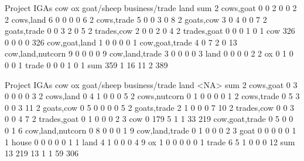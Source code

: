 \begin{Schunk}
\begin{Soutput}
                  Project
IGAs               cow  ox goat/sheep business/trade land sum
  2 cows,goat        0   0          2              0    0   2
  2 cows,land        6   0          0              0    0   6
  2 cows,trade       5   0          0              3    0   8
  2 goats,cow        3   0          4              0    0   7
  2 goats,trade      0   0          3              2    0   5
  2 trades,cow       2   0          0              2    0   4
  2 trades,goat      0   0          0              1    0   1
  cow              326   0          0              0    0 326
  cow,goat,land      1   0          0              0    0   1
  cow,goat,trade     4   0          7              2    0  13
  cow,land,nutcorn   9   0          0              0    0   9
  cow,land,trade     3   0          0              0    0   3
  land               0   0          0              0    2   2
  ox                 0   1          0              0    0   1
  trade              0   0          0              1    0   1
  sum              359   1         16             11    2 389
\end{Soutput}
\begin{Soutput}
                  Project
IGAs               cow  ox goat/sheep business/trade land <NA> sum
  2 cows,goat        0   3          0              0    0    0   3
  2 cows,land        0   4          1              0    0    0   5
  2 cows,nutcorn     0   1          0              0    0    0   1
  2 cows,trade       0   5          3              0    0    3  11
  2 goats,cow        0   5          0              0    0    0   5
  2 goats,trade      2   1          0              0    0    7  10
  2 trades,cow       0   0          3              0    0    4   7
  2 trades,goat      0   1          0              0    0    2   3
  cow                0 179          5              1    1   33 219
  cow,goat,trade     0   5          0              0    0    1   6
  cow,land,nutcorn   0   8          0              0    0    1   9
  cow,land,trade     0   1          0              0    0    2   3
  goat               0   0          0              0    0    1   1
  house              0   0          0              0    0    1   1
  land               4   1          0              0    0    4   9
  ox                 1   0          0              0    0    0   1
  trade              6   5          1              0    0    0  12
  sum               13 219         13              1    1   59 306

\end{Soutput}
\end{Schunk}
